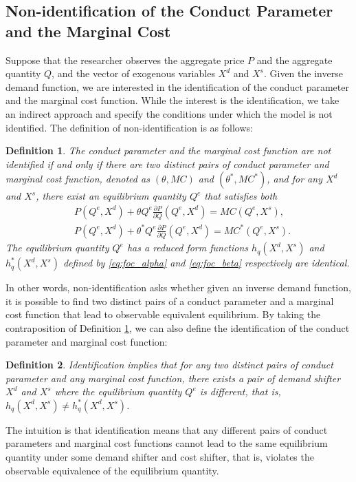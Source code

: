 \documentclass[11pt, a4paper]{article}
\newtheorem{definition}{Definition}
\theoremstyle{remark}
\begin{document}
\subsection{Non-identification of the Conduct Parameter and the Marginal Cost}\label{sec:definition_identification}
Suppose that the researcher observes the aggregate price $P$ and the aggregate quantity $Q$, and the vector of exogenous variables $X^{d}$ and $X^{s}$.
Given the inverse demand function, we are interested in the identification of the conduct parameter and the marginal cost function.
While the interest is the identification, we take an indirect approach and specify the conditions under which the model is not identified.
The definition of non-identification is as follows:
\begin{definition}\label{definition:non_identification}
    The conduct parameter and the marginal cost function are not identified if and only if 
    there are two distinct pairs of conduct parameter and marginal cost function, denoted as $(\theta, MC)$ and $(\theta^{*}, MC^{*})$, and for any $X^{d}$ and $X^{s}$, there exist an equilibrium quantity $Q^e$ that satisfies both
    \begin{align}
    & P(Q^e, X^{d}) + \theta Q^e\frac{\partial P}{\partial Q}(Q^e, X^{d}) = MC(Q^e, X^{s}) ,  \label{eq:foc_alpha}\\
    & P(Q^e, X^{d}) + \theta^{*} Q^e\frac{\partial P}{\partial Q}(Q^e, X^{d}) = MC^{*}(Q^e, X^{s}).\label{eq:foc_beta}
    \end{align}
    The equilibrium quantity $Q^e$ has a reduced form functions $h_q(X^{d}, X^{s})$ and $h_q^{*}(X^{d}, X^{s})$ defined by \eqref{eq:foc_alpha} and \eqref{eq:foc_beta} respectively are identical.
\end{definition}
In other words, non-identification asks whether given an inverse demand function, it is possible to find two distinct pairs of a conduct parameter and a marginal cost function that lead to observable equivalent equilibrium.
By taking the contraposition of Definition \ref{definition:non_identification}, we can also define the identification of the conduct parameter and marginal cost function:
\begin{definition}\label{definition:identification}
    Identification implies that for any two distinct pairs of conduct parameter and any marginal cost function, there exists a pair of demand shifter $X^{d}$ and $X^{s}$ where the equilibrium quantity $Q^e$ is different, that is, $h_q(X^{d}, X^{s}) \ne h_q^{*}(X^{d}, X^{s})$.
\end{definition}
The intuition is that identification means that any different pairs of conduct parameters and marginal cost functions cannot lead to the same equilibrium quantity under some demand shifter and cost shifter, that is, violates the observable equivalence of the equilibrium quantity.
\end{document}
